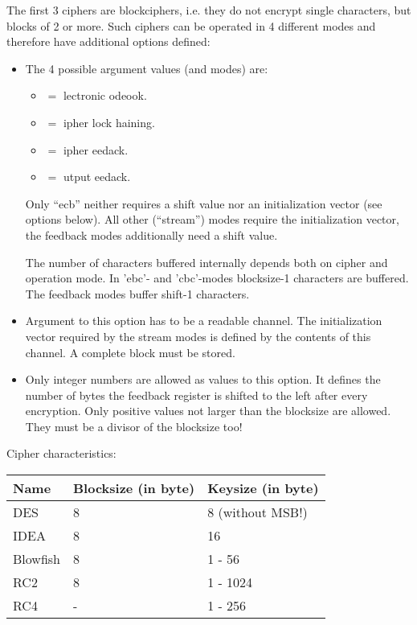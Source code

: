 The first 3 ciphers are blockciphers, i.e. they do not encrypt single
characters, but blocks of 2 or more. Such ciphers can be operated in 4
different modes and therefore have additional options defined:

\begin {itemize}
\item[-mode]	The 4 possible argument values (and modes) are:
	\begin {itemize}
	\item[ecb]	$=$ lectronic odeook.
	\item[cbc]	$=$ ipher lock haining.
	\item[cfb]	$=$ ipher eedack.
	\item[ofb]	$=$ utput eedack.
	\end   {itemize}

	Only ``ecb'' neither requires a shift value nor an initialization
	vector (see options below). All other (``stream'') modes require
	the initialization vector, the feedback modes additionally
	need a shift value.

	The number of characters buffered internally depends both on
	cipher and operation mode.
	In 'ebc'- and 'cbc'-modes blocksize-1 characters are buffered.
	The feedback modes buffer shift-1 characters.


\item[-iv]	Argument to this option has to be a readable
		channel. The initialization vector required by the
		stream modes is defined by the contents of this
		channel. A complete block must be stored.

\item[-shift]	Only integer numbers are allowed as values to this
		option. It defines the number of bytes the feedback
		register is shifted to the left after every
		encryption. Only positive values not larger than the
		blocksize are allowed. They must be a divisor of the
		blocksize too!
\end   {itemize}


Cipher characteristics:

\begin {center}
	\begin {tabular}{|l|l|l|}\hline
	Name		& Blocksize (in byte)	& Keysize (in byte) \\ \hline\hline
	DES		& 8			& 8 (without MSB!) \\ \hline
	IDEA		& 8			& 16 \\ \hline
	Blowfish	& 8			& 1 - 56 \\ \hline
	RC2		& 8			& 1 - 1024\footnotemark \\ \hline\hline
	RC4		& -			& 1 - 256 \\ \hline
	\end   {tabular}
\end   {center}

